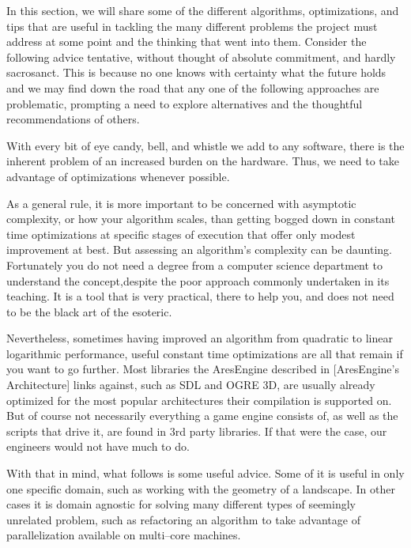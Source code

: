 
In this section, we will share some of the different algorithms, optimizations, and tips that are useful in tackling the many different problems the project must address at some point and the thinking that went into them. Consider the following advice tentative, without thought of absolute commitment, and hardly sacrosanct. This is because no one knows with certainty what the future holds and we may find down the road that any one of the following approaches are problematic, prompting a need to explore alternatives and the thoughtful recommendations of others.

With every bit of eye candy, bell, and whistle we add to any software, there is the inherent problem of an increased burden on the hardware. Thus, we need to take advantage of optimizations whenever possible. 

As a general rule, it is more important to be concerned with asymptotic complexity, or how your algorithm scales, than getting bogged down in constant time optimizations at specific stages of execution that offer only modest improvement at best. But assessing an algorithm's complexity can be daunting. Fortunately you do not need a degree from a computer science department to understand the concept, despite the poor approach commonly undertaken in its teaching. It is a tool that is very practical, there to help you, and does not need to be the black art of the esoteric.

Nevertheless, sometimes having improved an algorithm from quadratic to linear logarithmic performance, useful constant time optimizations are all that remain if you want to go further. Most libraries the AresEngine described in [AresEngine's Architecture] links against, such as SDL and OGRE 3D, are usually already optimized for the most popular architectures their compilation is supported on. But of course not necessarily everything a game engine consists of, as well as the scripts that drive it, are found in 3rd party libraries. If that were the case, our engineers would not have much to do.

With that in mind, what follows is some useful advice. Some of it is useful in only one specific domain, such as working with the geometry of a landscape. In other cases it is domain agnostic for solving many different types of seemingly unrelated problem, such as refactoring an algorithm to take advantage of parallelization available on multi--core machines.

